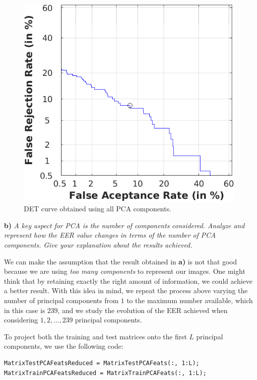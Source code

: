 \documentclass[11pt]{article}
\begin{document}
\begin{figure}[h!]
  \centering
    \includegraphics[scale=0.425]{img/2a_det}
    \caption{DET curve obtained using all PCA components.}
    \label{fig:ex2a}
\end{figure}

\textbf{b)} \emph{A key aspect for PCA is the number of components considered. Analyze and represent how the EER value changes in terms of the number of PCA components. Give your explanation about the results achieved.}

We can make the assumption that the result obtained in \textbf{a)} is not that good because we are using \textit{too many components} to represent our images. One might think that by retaining exactly the right amount of information, we could achieve a better result. With this idea in mind, we repeat the process above varying the number of principal components from $1$ to the maximum number available, which in this case is $239$, and we study the evolution of the EER achieved when considering $1,2,\dots,239$ principal components.

To project both the training and test matrices onto the first $L$ principal components, we use the following code:
\begin{verbatim}
MatrixTestPCAFeatsReduced = MatrixTestPCAFeats(:, 1:L);
MatrixTrainPCAFeatsReduced = MatrixTrainPCAFeats(:, 1:L);
\end{verbatim}
\end{document}
